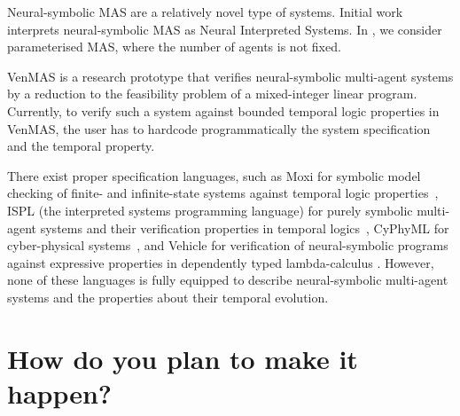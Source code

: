 \documentclass[11pt]{article}
\begin{document}


Neural-symbolic MAS are a relatively novel type of systems. Initial
work \cite{Akintunde+18,Akintunde+20,Akintunde+22} interprets
neural-symbolic MAS as Neural Interpreted Systems. In
\cite{KouvarosBB24}, we consider parameterised MAS, where the number
of agents is not fixed.

VenMAS \cite{Akintunde+22b} is a research prototype that verifies
neural-symbolic multi-agent systems by a reduction to the feasibility
problem of a mixed-integer linear program.  Currently, to verify such
a system against bounded temporal logic properties in VenMAS, the user
has to hardcode programmatically the system specification and the
temporal property.

There exist proper specification languages, such as Moxi for symbolic model
checking of finite- and infinite-state systems against temporal logic
properties~\cite{Rozier+2024}, ISPL (the interpreted systems
programming language) for purely symbolic multi-agent systems and
their verification properties in temporal logics~\cite{LomuscioQR17},
CyPhyML for cyber-physical systems~\cite{Simko+13}, and Vehicle for
verification of neural-symbolic programs against expressive properties
in dependently typed lambda-calculus \cite{Daggitt+24}. However, none
of these languages is fully equipped to describe neural-symbolic
multi-agent systems and the properties about their temporal evolution.


\section{How do you plan to make it happen?}


\end{document}
